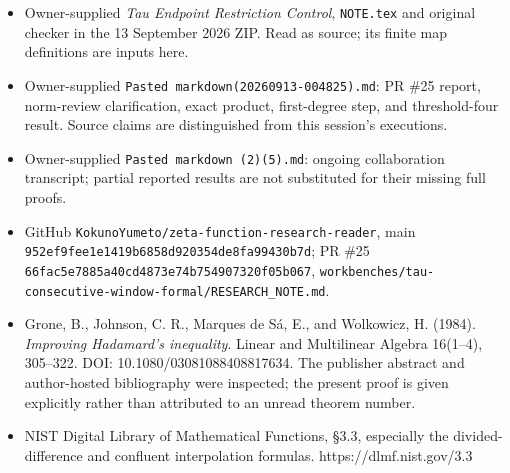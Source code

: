 \documentclass[
  11pt,
]{article}
\providecommand{\tightlist}{%
  \setlength{\itemsep}{0pt}\setlength{\parskip}{0pt}}
\begin{document}
\begin{itemize}
\tightlist
\item
  Owner-supplied \emph{Tau Endpoint Restriction Control},
  \texttt{NOTE.tex} and original checker in the 13 September 2026 ZIP.
  Read as source; its finite map definitions are inputs here.
\item
  Owner-supplied \texttt{Pasted\ markdown(20260913-004825).md}: PR \#25
  report, norm-review clarification, exact product, first-degree step,
  and threshold-four result. Source claims are distinguished from this
  session's executions.
\item
  Owner-supplied \texttt{Pasted\ markdown\ (2)(5).md}: ongoing
  collaboration transcript; partial reported results are not substituted
  for their missing full proofs.
\item
  GitHub \texttt{KokunoYumeto/zeta-function-research-reader}, main
  \texttt{952ef9fee1e1419b6858d920354de8fa99430b7d}; PR \#25
  \texttt{66fac5e7885a40cd4873e74b754907320f05b067},
  \texttt{workbenches/tau-consecutive-window-formal/RESEARCH\_NOTE.md}.
\item
  Grone, B., Johnson, C. R., Marques de Sá, E., and Wolkowicz, H.
  (1984). \emph{Improving Hadamard's inequality}. Linear and Multilinear
  Algebra 16(1--4), 305--322. DOI: 10.1080/03081088408817634. The
  publisher abstract and author-hosted bibliography were inspected; the
  present proof is given explicitly rather than attributed to an unread
  theorem number.
\item
  NIST Digital Library of Mathematical Functions, §3.3, especially the
  divided-difference and confluent interpolation formulas.
  https://dlmf.nist.gov/3.3
\end{itemize}
\end{document}
